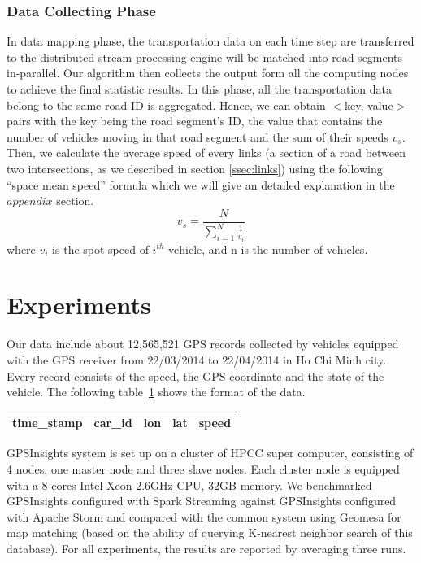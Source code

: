 \documentclass{acm_proc_article-sp}
\begin{document}
\subsubsection{Data Collecting Phase} \label{datacollectingphase} In data mapping phase, the transportation data on each time step are transferred to the distributed stream processing engine will be matched into road segments in-parallel. Our algorithm then collects the output form all the computing nodes to achieve the final statistic results.  In this phase, all the transportation data belong to the same road ID is aggregated. Hence, we can obtain $<$key, value$>$ pairs with the key being the road segment's ID, the value that contains the number of vehicles moving in that road segment and the sum of their speeds $v_{s}$. Then, we calculate the average speed of every links (a section of a road between two intersections, as we described in section \ref{ssec:links}) using the following ``space mean speed'' formula which we will give an detailed explanation in the $appendix$ section.
\[ v_{s} = \frac{N}{\sum_{i=1}^{N}\frac{1}{v_{i}}}\]
where $v_{i}$ is the spot speed of $i^{th}$ vehicle, and n is the number of vehicles.

\section{Experiments}

Our data include about 12,565,521 GPS records collected by vehicles equipped with the GPS receiver from 22/03/2014 to 22/04/2014 in Ho Chi Minh city. Every record consists of the speed, the GPS coordinate and the state of the vehicle. The following table~\ref{table:location-data} shows the format of the data.

\begin{table}[h]
\centering
\begin{tabular}{|c|c|c|c|c|}
\hline
\textbf{time\_stamp} & \textbf{car\_id} & \textbf{lon}   & \textbf{lat} & \textbf{speed} \\ \hline
\end{tabular}
\label{table:location-data}
\end{table}


GPSInsights system is set up on a cluster of HPCC super computer, consisting of 4 nodes, one master node and three slave nodes. Each cluster node is equipped with a  8-cores Intel Xeon 2.6GHz CPU, 32GB memory. We benchmarked GPSInsights configured with Spark Streaming against GPSInsights configured with Apache Storm and compared with the common system using Geomesa for map matching (based on the ability of querying K-nearest neighbor search of this database). For all experiments, the results are reported by averaging three runs. 
	
\end{document}
